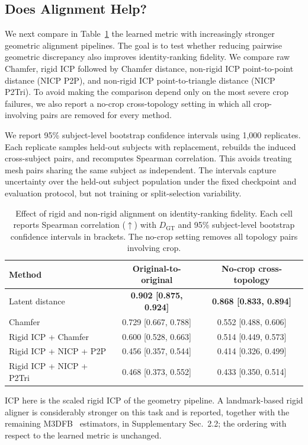 \documentclass{article}
\begin{document}
\subsection{Does Alignment Help?}
\label{sec:alignment_results}

We next compare in Table~\ref{tab:alignment_effect} the learned metric with increasingly stronger geometric alignment pipelines. The goal is to test whether reducing pairwise geometric discrepancy also improves identity-ranking fidelity. We compare raw Chamfer, rigid ICP followed by Chamfer distance, non-rigid ICP point-to-point distance (NICP P2P), and non-rigid ICP point-to-triangle distance (NICP P2Tri). To avoid making the comparison depend only on the most severe crop failures, we also report a no-crop cross-topology setting in which all crop-involving pairs are removed for every method.

We report 95\% subject-level bootstrap confidence intervals using 1,000
replicates. Each replicate samples held-out subjects with replacement, rebuilds
the induced cross-subject pairs, and recomputes Spearman correlation. This avoids
treating mesh pairs sharing the same subject as independent. The intervals
capture uncertainty over the held-out subject population under the fixed
checkpoint and evaluation protocol, but not training or split-selection
variability.

\begin{table}[!ht]
\centering
\small
\caption{Effect of rigid and non-rigid alignment on identity-ranking fidelity.
Each cell reports Spearman correlation ($\uparrow$) with $D_{\mathrm{GT}}$ and
95\% subject-level bootstrap confidence intervals in brackets. The no-crop
setting removes all topology pairs involving crop.}
\label{tab:alignment_effect}
\begin{tabular}{lcc}
\toprule
Method & Original-to-original & No-crop cross-topology \\
\midrule
Latent distance & \textbf{0.902 [0.875, 0.924]} & \textbf{0.868 [0.833, 0.894]} \\
Chamfer & 0.729 [0.667, 0.788] & 0.552 [0.488, 0.606] \\
Rigid ICP + Chamfer & 0.600 [0.528, 0.663] & 0.514 [0.449, 0.573] \\
Rigid ICP + NICP + P2P & 0.456 [0.357, 0.544] & 0.414 [0.326, 0.499] \\
Rigid ICP + NICP + P2Tri & 0.468 [0.373, 0.552] & 0.433 [0.350, 0.514] \\
\bottomrule
\end{tabular}

\vspace{0.3em}
\footnotesize{ICP here is the scaled rigid ICP of the geometry pipeline. A landmark-based
rigid aligner is considerably stronger on this task and is reported, together with the
remaining M3DFB~\cite{fg2025} estimators, in Supplementary Sec.~2.2; the ordering with
respect to the learned metric is unchanged.}
\end{table}
\end{document}
